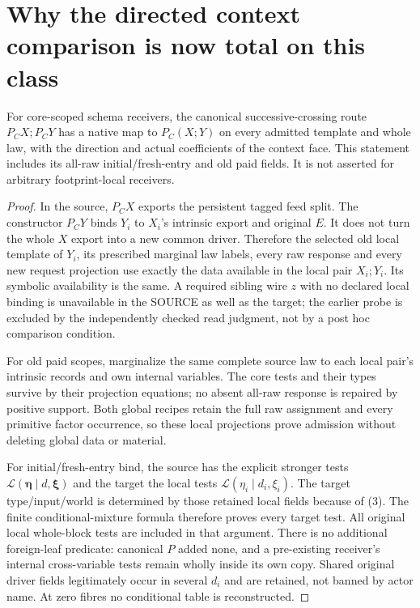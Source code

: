 \documentclass[11pt]{article}
\begin{document}
\section{Why the directed context comparison is now total on this class}
\begin{theorem}
For core-scoped schema receivers, the canonical successive-crossing route $P_CX;P_CY$ has a native map to $P_C(X;Y)$ on every admitted template and whole law, with the direction and actual coefficients of the context face. This statement includes its all-raw initial/fresh-entry and old paid fields. It is not asserted for arbitrary footprint-local receivers.
\end{theorem}
\begin{proof}
In the source, $P_CX$ exports the persistent tagged feed split. The constructor $P_CY$ binds $Y_i$ to $X_i$'s intrinsic export and original $E$. It does not turn the whole $X$ export into a new common driver. Therefore the selected old local template of $Y_i$, its prescribed marginal law labels, every raw response and every new request projection use exactly the data available in the local pair $X_i;Y_i$. Its symbolic availability is the same. A required sibling wire $z$ with no declared local binding is unavailable in the SOURCE as well as the target; the earlier probe is excluded by the independently checked read judgment, not by a post hoc comparison condition.

For old paid scopes, marginalize the same complete source law to each local pair's intrinsic records and own internal variables. The core tests and their types survive by their projection equations; no absent all-raw response is repaired by positive support. Both global recipes retain the full raw assignment and every primitive factor occurrence, so these local projections prove admission without deleting global data or material.

For initial/fresh-entry bind, the source has the explicit stronger tests $\mathcal L(\boldsymbol\eta\mid d,\boldsymbol\xi)$ and the target the local tests $\mathcal L(\eta_i\mid d_i,\xi_i)$. The target type/input/world is determined by those retained local fields because of (3). The finite conditional-mixture formula therefore proves every target test. All original local whole-block tests are included in that argument. There is no additional foreign-leaf predicate: canonical $P$ added none, and a pre-existing receiver's internal cross-variable tests remain wholly inside its own copy. Shared original driver fields legitimately occur in several $d_i$ and are retained, not banned by actor name. At zero fibres no conditional table is reconstructed.


\end{proof}
\end{document}
